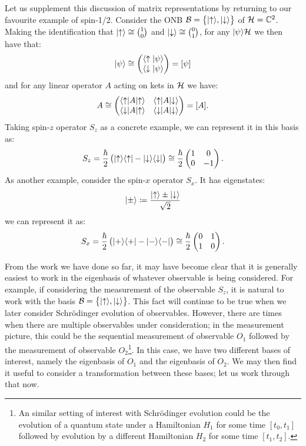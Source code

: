 Let us supplement this discussion of matrix representations by returning to our favourite example of spin-1/2. Consider the ONB $\mathcal{B} = \set{\lvert \uparrow \rangle, \lvert \downarrow \rangle}$ of $\mathcal{H} = \mathbb{C}^2$. Making the identification that $\lvert \uparrow \rangle \cong \binom{1}{0}$ and $\lvert \downarrow \rangle \cong \binom{0}{1}$, for any $\lvert \psi \rangle \mathcal{H}$ we then have that:
\begin{equation}
    \lvert \psi \rangle \cong \begin{pmatrix} \langle \uparrow \lvert \psi \rangle \\ \langle \downarrow \lvert \psi \rangle \end{pmatrix} = [\psi]
\end{equation}
and for any linear operator $A$ acting on kets in $\mathcal{H}$ we have:
\begin{equation}
    A \cong \begin{pmatrix} \langle \uparrow \rvert A\lvert \uparrow \rangle & \langle \uparrow \rvert A\lvert \downarrow \rangle \\ \langle \downarrow \rvert A\lvert \uparrow \rangle & \langle \downarrow \rvert A\lvert \downarrow \rangle \end{pmatrix} = [A].
\end{equation}
Taking spin-$z$ operator $S_z$ as a concrete example, we can represent it in this basis as:
\begin{equation}
    S_z = \frac{\hbar}{2}\left(\lvert \uparrow \rangle \langle \uparrow \rvert - \lvert \downarrow \rangle \langle \downarrow \rvert\right) \cong \frac{\hbar}{2}\begin{pmatrix} 1 & 0 \\ 0 & -1 \end{pmatrix}.
\end{equation}
As another example, consider the spin-$x$ operator $S_x$. It has eigenstates:
\begin{equation}
    \lvert \pm \rangle \coloneqq \frac{\lvert \uparrow \rangle \pm \lvert \downarrow \rangle}{\sqrt{2}}
\end{equation}
we can represent it as:
\begin{equation}
    S_x = \frac{\hbar}{2}\left(\lvert + \rangle \langle + \rvert - \lvert - \rangle \langle - \rvert\right) \cong \frac{\hbar}{2}\begin{pmatrix} 0 & 1 \\ 1 & 0 \end{pmatrix}.
\end{equation}

From the work we have done so far, it may have become clear that it is generally easiest to work in the eigenbasis of whatever observable is being considered. For example, if considering the measurement of the observable $S_z$, it is natural to work with the basis $\mathcal{B} = \set{\lvert \uparrow \rangle, \lvert \downarrow \rangle}$. This fact will continue to be true when we later consider Schr\"{o}dinger evolution of observables. However, there are times when there are multiple observables under consideration; in the measurement picture, this could be the sequential measurement of observable $O_1$ followed by the measurement of observable $O_2$\footnote{An similar setting of interest with Schr\"{o}dinger evolution could be the evolution of a quantum state under a Hamiltonian $H_1$ for some time $[t_0, t_1]$ followed by evolution by a different Hamiltonian $H_2$ for some time $[t_1, t_2]$.}. In this case, we have two different bases of interest, namely the eigenbasis of $O_1$ and the eigenbasis of $O_2$. We may then find it useful to consider a transformation between these bases; let us work through that now. 

